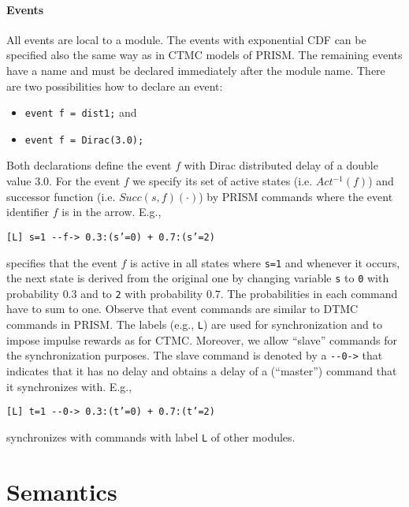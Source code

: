 \documentclass{article}
\newcommand{\suc}{Succ}
\newcommand{\act}{Act}
\newcommand{\code}[1]{\texttt{#1}}
\begin{document}
\paragraph{Events}
All events are local to a module.
The events with exponential CDF can be specified also the same way as in CTMC models of PRISM. 
The remaining events have a name and must be declared immediately after the module name.
There are two possibilities how to declare an event:
\begin{itemize}
	\item \code{event f = dist1;} and
	\item \code{event f = Dirac(3.0);}
\end{itemize}
Both declarations define the event $f$ with Dirac distributed delay of a double value $3.0$.
For the event $f$ we specify its set of active states (i.e. $\act^{-1}(f)$) and successor function (i.e. $\suc(s, f)(\cdot)$) by PRISM commands where the event identifier $f$ is in the arrow. 
E.g., 
\begin{center}
	\code{[L] s=1 {-}{-}f-> 0.3:(s'=0) + 0.7:(s'=2)}
\end{center}
specifies that the event $f$ is active in all states where \code{s=1} and whenever it occurs, the next state is derived from the original one by changing variable \code{s} to \code{0} with probability $0.3$ and to \code{2} with probability $0.7$. 
The probabilities in each command have to sum to one. 
Observe that event commands are similar to DTMC commands in PRISM. 
The labels (e.g., \code{L}) are used for synchronization and to impose impulse rewards as for CTMC. 
Moreover, we allow ``slave'' commands for the synchronization purposes. 
The slave command is denoted by a \code{{-}{-}0->} that indicates that it has no delay and obtains a delay of a (``master'') command that it synchronizes with.
E.g., 
\begin{center}
	\code{[L] t=1 {-}{-}0-> 0.3:(t'=0) + 0.7:(t'=2)}
\end{center}
synchronizes with commands with label \code{L} of other modules.

\newpage
\section*{Semantics}
\end{document}
